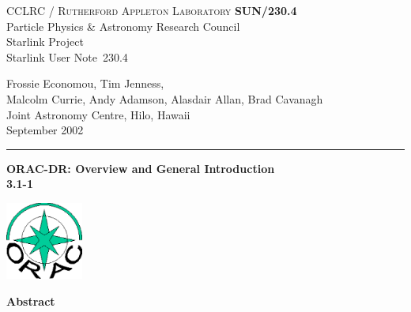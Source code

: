\documentclass[twoside,11pt]{article}
\newcommand{\stardoccategory}  {Starlink User Note}
\newcommand{\stardocinitials}  {SUN}
\newcommand{\stardocnumber}    {230.4}
\newcommand{\stardocauthors}   {Frossie Economou, Tim Jenness,\\ 
Malcolm Currie, Andy Adamson, Alasdair Allan, Brad Cavanagh\\
Joint Astronomy Centre, Hilo, Hawaii}
\newcommand{\stardocdate}      {September 2002}
\newcommand{\stardoctitle}     {ORAC-DR: Overview and General Introduction}
\newcommand{\stardocversion}   {3.1-1}
\newcommand{\stardocmanual}    {}
\newcommand{\stardocname}{\stardocinitials /\stardocnumber}
\newenvironment{latexonly}{}{}
\renewcommand{\_}{\texttt{\symbol{95}}}
\begin{document}
\thispagestyle{empty}

\begin{latexonly}
   CCLRC / \textsc{Rutherford Appleton Laboratory} \hfill \textbf{\stardocname}\\
   {\large Particle Physics \& Astronomy Research Council}\\
   {\large Starlink Project\\}
   {\large \stardoccategory\ \stardocnumber}
   \begin{flushright}
   \stardocauthors\\
   \stardocdate
   \end{flushright}
   \vspace{-4mm}
   \rule{\textwidth}{0.5mm}
   \vspace{5mm}
   \begin{center}
   {\Huge\textbf{\stardoctitle \\ [2.5ex]}}
   {\LARGE\textbf{\stardocversion \\ [4ex]}}
   {\Huge\textbf{\stardocmanual}}
   \end{center}
   \vspace{5mm}

\begin{center}
\includegraphics[width=1.0in]{sun230_logo.eps}
\end{center}

   \vspace{10mm}
   \begin{center}
      {\Large\textbf{Abstract}}
   \end{center}
\end{latexonly}
\end{document}
